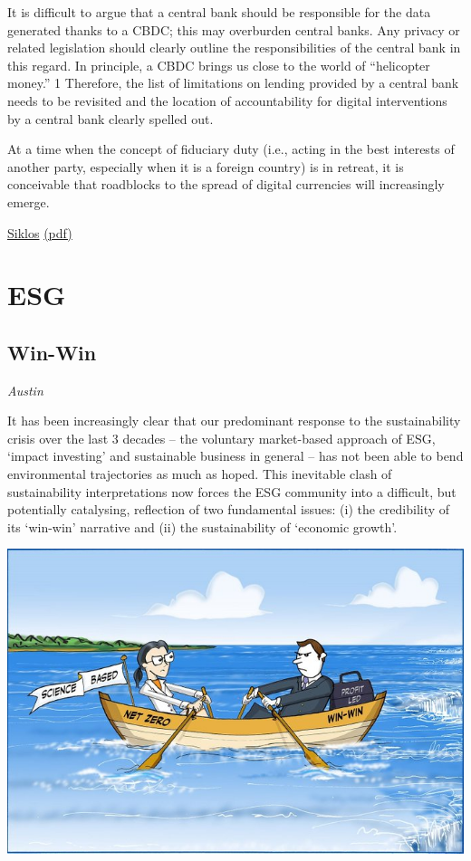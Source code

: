 \documentclass[
]{book}
\begin{document}
It is difficult to argue that a central bank
should be responsible for the data generated
thanks to a CBDC; this may overburden central
banks. Any privacy or related legislation should
clearly outline the responsibilities of the central
bank in this regard. In principle, a CBDC brings
us close to the world of ``helicopter money.'' 1
Therefore, the list of limitations on lending
provided by a central bank needs to be revisited
and the location of accountability for digital
interventions by a central bank clearly spelled out.

At a time when
the concept of fiduciary duty (i.e., acting in the best
interests of another party, especially when it is a
foreign country) is in retreat, it is conceivable that
roadblocks to the spread of digital currencies will
increasingly emerge.

\href{https://www.cigionline.org/publications/central-bank-digital-currency-and-governance-fit-purpose}{Siklos}
\href{pdf/Siklos_2021_Central_Bank_Digital_Currency.pdf}{(pdf)}

\hypertarget{esg}{%
\chapter{ESG}\label{esg}}

\hypertarget{win-win}{%
\section{Win-Win}\label{win-win}}

\emph{Austin}

It has been increasingly clear that our predominant response to the sustainability crisis over the last 3 decades -- the voluntary market-based approach of ESG, `impact investing' and sustainable business in general -- has not been able to bend environmental trajectories as much as hoped. This inevitable clash of sustainability interpretations now forces the ESG community into a difficult, but potentially catalysing, reflection of two fundamental issues: (i) the credibility of its `win-win' narrative and (ii) the sustainability of `economic growth'.

\includegraphics{fig/win-win_vs_net-zero.jpeg}
\end{document}
